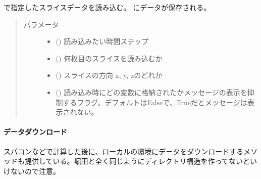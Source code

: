 \documentclass[letterpaper,10pt,dvipdfmx,report]{sphinxmanual}
\begin{document}
\begin{fulllineitems}
\label{\detokenize{io:R2D2.R2D2_data.read_qq_slice}}
 で指定したスライスデータを読み込む。{\hyperref[\detokenize{io:R2D2.R2D2_data.ql}]{}} にデータが保存される。
\begin{quote}\begin{description}
\item[{パラメータ}] \leavevmode\begin{itemize}
\item {} 
 () \sphinxhyphen{}\sphinxhyphen{} 読み込みたい時間ステップ

\item {} 
 () \sphinxhyphen{}\sphinxhyphen{} 何枚目のスライスを読み込むか

\item {} 
 () \sphinxhyphen{}\sphinxhyphen{} スライスの方向 \textquotesingle{}x\textquotesingle{}, \textquotesingle{}y\textquotesingle{}, \textquotesingle{}z\textquotesingle{}のどれか

\item {} 
 () \sphinxhyphen{}\sphinxhyphen{} 読み込み時にどの変数に格納されたかメッセージの表示を抑制するフラグ。デフォルトはFalseで、Trueだとメッセージは表示されない。

\end{itemize}

\end{description}\end{quote}

\end{fulllineitems}



\paragraph{データダウンロード}
\label{\detokenize{io:id6}}
スパコンなどで計算した後に、ローカルの環境にデータをダウンロードするメソッドも提供している。堀田と全く同じようにディレクトリ構造を作ってないといけないので注意。
\end{document}
